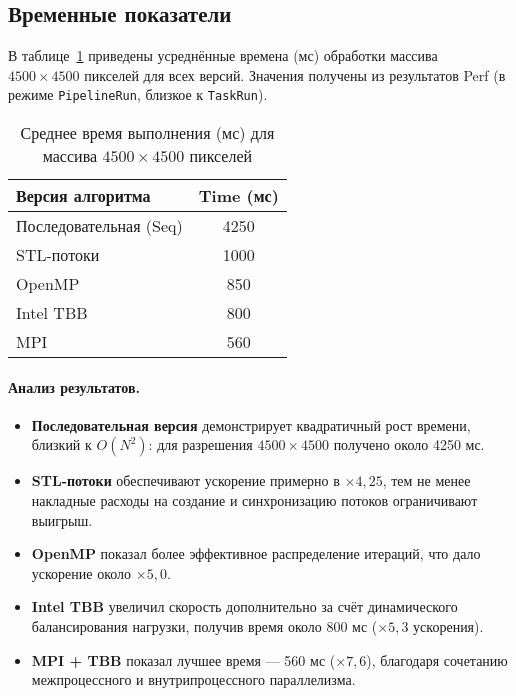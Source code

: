 \documentclass[12pt]{article}
\begin{document}
\subsection{Временные показатели}

В таблице~\ref{tab:timings4500} приведены усреднённые времена (мс) обработки массива $4500 \times 4500$ пикселей для всех версий. Значения получены из результатов Perf (в режиме \texttt{PipelineRun}, близкое к \texttt{TaskRun}).

\begin{table}[H]
    \centering
    \caption{Среднее время выполнения (мс) для массива $4500\times 4500$ пикселей}
    \label{tab:timings4500}
    \begin{tabular}{|l|c|}
        \hline
        \textbf{Версия алгоритма} & \textbf{Time (мс)} \\
        \hline
        Последовательная (Seq)            & 4250  \\
        STL-потоки                        & 1000  \\
        OpenMP                            &  850  \\
        Intel TBB                         &  800  \\
        MPI                               &  560  \\
        \hline
    \end{tabular}
\end{table}

\paragraph{Анализ результатов.}  
\begin{itemize}
    \item \textbf{Последовательная версия} демонстрирует квадратичный рост времени, близкий к $O(N^2)$: для разрешения $4500\times4500$ получено около 4250 мс.
    \item \textbf{STL-потоки} обеспечивают ускорение примерно в $\times 4{,}25$, тем не менее накладные расходы на создание и синхронизацию потоков ограничивают выигрыш.
    \item \textbf{OpenMP} показал более эффективное распределение итераций, что дало ускорение около $\times 5{,}0$.
    \item \textbf{Intel TBB} увеличил скорость дополнительно за счёт динамического балансирования нагрузки, получив время около 800 мс ($\times 5{,}3$ ускорения).
    \item \textbf{MPI + TBB } показал лучшее время — 560 мс ($\times 7{,}6$), благодаря сочетанию межпроцессного и внутрипроцессного параллелизма.
\end{itemize}
\end{document}
